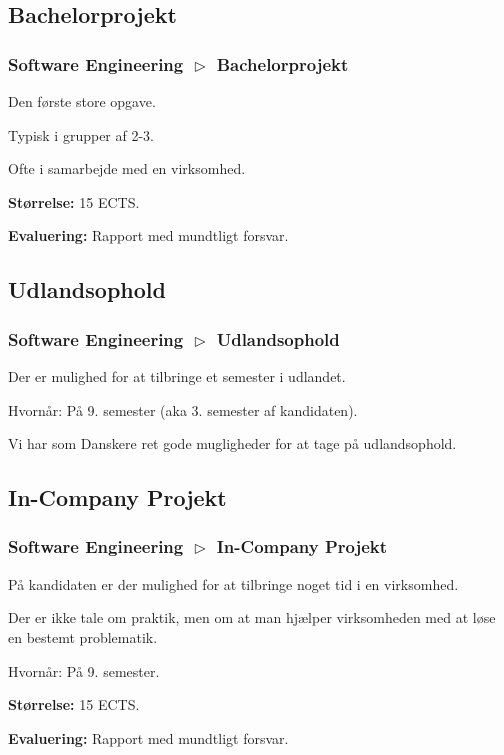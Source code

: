 \subsection{Bachelorprojekt}
\begin{frame}[fragile]
  \frametitle{Software Engineering $\vartriangleright$ Bachelorprojekt}
  \vspace{3mm}
  Den første store opgave.
  
  \pause
  \vspace{5mm}
  Typisk i grupper af 2-3.
  
  \pause
  \vspace{5mm}
  Ofte i samarbejde med en virksomhed.
  
  \pause
  \vspace{5mm}
  \textbf{Størrelse:} 15 ECTS.
  
  \pause
  \vspace{5mm}
  \textbf{Evaluering:} Rapport med mundtligt forsvar.
\end{frame}

\subsection{Udlandsophold}
\begin{frame}[fragile]
  \frametitle{Software Engineering $\vartriangleright$ Udlandsophold}
  \vspace{3mm}
  Der er mulighed for at tilbringe et semester i udlandet.
  
  \pause
  \vspace{5mm}
  Hvornår: På 9. semester \pause (aka 3. semester af kandidaten).
  
  \pause
  \vspace{5mm}
  Vi har som Danskere ret gode mugligheder for at tage på udlandsophold.
\end{frame}

\subsection{In-Company Projekt}
\begin{frame}[fragile]
  \frametitle{Software Engineering $\vartriangleright$ In-Company Projekt}
  \vspace{3mm}
  På kandidaten er der mulighed for at tilbringe noget tid i en virksomhed.
  
  \pause
  \vspace{5mm}
  Der er ikke tale om praktik, men om at man hjælper virksomheden med at løse en bestemt problematik.
  
  \pause
  \vspace{5mm}
  Hvornår: På 9. semester.
  
  \pause
  \vspace{5mm}
  \textbf{Størrelse:} 15 ECTS.
  
  \pause
  \vspace{5mm}
  \textbf{Evaluering:} Rapport med mundtligt forsvar.
\end{frame}

